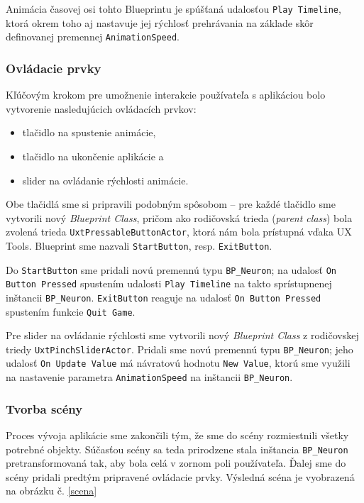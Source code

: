 Animácia časovej osi tohto Blueprintu je spúšťaná udalosťou \texttt{Play Timeline}, ktorá okrem toho aj nastavuje jej rýchlosť prehrávania na základe skôr definovanej premennej \texttt{AnimationSpeed}.

\subsubsection{Ovládacie prvky}
Kľúčovým krokom pre umožnenie interakcie používateľa s aplikáciou bolo vytvorenie nasledujúcich ovládacích prvkov:

\begin{itemize}
  \item tlačidlo na spustenie animácie,
  \item tlačidlo na ukončenie aplikácie a 
  \item slider na ovládanie rýchlosti animácie.
\end{itemize}

Obe tlačidlá sme si pripravili podobným spôsobom {--} pre každé tlačidlo sme vytvorili nový \emph{Blueprint Class}, pričom ako rodičovská trieda (\emph{parent class}) bola zvolená trieda \texttt{UxtPressableButtonActor}, ktorá nám
bola prístupná vďaka UX Tools. Blueprint sme nazvali \texttt{StartButton}, resp. \texttt{ExitButton}. 

Do \texttt{StartButton} sme pridali novú premennú typu \texttt{BP\_Neuron}; na udalosť \texttt{On Button Pressed} spustením udalosti \texttt{Play Timeline} na takto sprístupnenej inštancii \texttt{BP\_Neuron}.
\texttt{ExitButton} reaguje na udalosť \texttt{On Button Pressed} spustením funkcie \texttt{Quit Game}.

Pre slider na ovládanie rýchlosti sme vytvorili nový \emph{Blueprint Class} z rodičovskej triedy \texttt{UxtPinchSliderActor}. Pridali sme novú premennú typu \texttt{BP\_Neuron}; jeho udalosť \texttt{On Update Value} má návratovú
hodnotu \texttt{New Value}, ktorú sme využili na nastavenie parametra \texttt{AnimationSpeed} na inštancii \texttt{BP\_Neuron}.

\subsubsection{Tvorba scény}
Proces vývoja aplikácie sme zakončili tým, že sme do scény rozmiestnili všetky potrebné objekty. Súčasťou scény sa teda prirodzene stala inštancia \texttt{BP\_Neuron} pretransformovaná tak, aby bola celá v zornom poli používateľa.
Ďalej sme do scény pridali predtým pripravené ovládacie prvky. Výsledná scéna je vyobrazená na obrázku č. \ref{scena}

